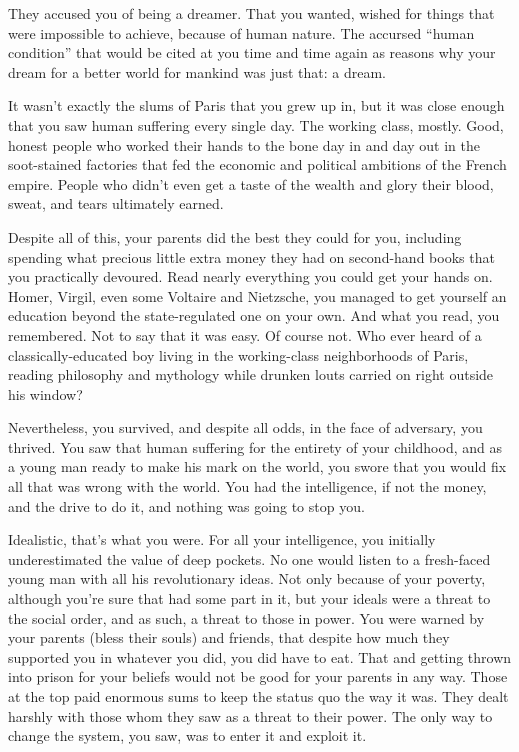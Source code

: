 \documentclass[char]{airship}
\begin{document}
\name{\cSaboteur{}}



They accused you of being a dreamer.  That you wanted, wished for
things that were impossible to achieve, because of human nature.  The
accursed ``human condition'' that would be cited at you time and time
again as reasons why your dream for a better world for mankind was
just that: a dream.

It wasn't exactly the slums of Paris that you grew up in, but it was
close enough that you saw human suffering every single day.  The
working class, mostly.  Good, honest people who worked their hands to
the bone day in and day out in the soot-stained factories that fed the
economic and political ambitions of the French empire.  People who
didn't even get a taste of the wealth and glory their blood, sweat,
and tears ultimately earned.

Despite all of this, your parents did the best they could for you,
including spending what precious little extra money they had on
second-hand books that you practically devoured.  Read nearly
everything you could get your hands on.  Homer, Virgil, even some
Voltaire and Nietzsche, you managed to get yourself an education beyond
the state-regulated one on your own.  And what you read, you
remembered.  Not to say that it was easy.  Of course not.  Who ever
heard of a classically-educated boy living in the working-class
neighborhoods of Paris, reading philosophy and mythology while drunken
louts carried on right outside his window?

Nevertheless, you survived, and despite all odds, in the face of
adversary, you thrived.  You saw that human suffering for the entirety
of your childhood, and as a young man ready to make his mark on the
world, you swore that you would fix all that was wrong with the world.
You had the intelligence, if not the money, and the drive to do it,
and nothing was going to stop you.

Idealistic, that's what you were.  For all your intelligence, you
initially underestimated the value of deep pockets.  No one would
listen to a fresh-faced young man with all his revolutionary ideas.
Not only because of your poverty, although you're sure that had some
part in it, but your ideals were a threat to the social order, and as
such, a threat to those in power.  You were warned by your parents
(bless their souls) and friends, that despite how much they supported
you in whatever you did, you did have to eat.  That and getting thrown
into prison for your beliefs would not be good for your parents in any
way.  Those at the top paid enormous sums to keep the status quo the
way it was.  They dealt harshly with those whom they saw as a threat
to their power.  The only way to change the system, you saw, was to
enter it and exploit it.
\end{document}
